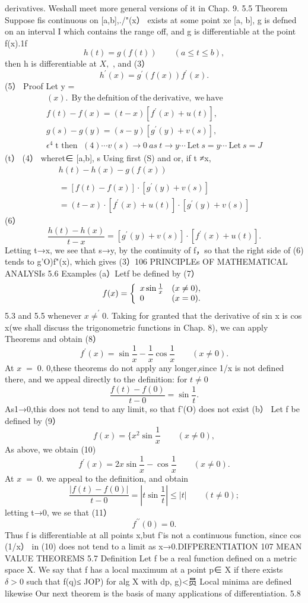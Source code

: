 derivatives. Weshall meet more general versions of it in Chap. 9. 5.5 Theorem Suppose fis continuous on [a,b],./"(x） exists at some point xe [a, b], g is defned on an interval I which contains the range off, and g is differentiable at the point f(x).1f $$ h(t)=g(f(t))\qquad(a\leq t\leq b), $$ then h is differentiable at $X,$ , and (3） $$ h^{\prime}(x)=g^{\prime}(f(x))f^{\prime}(x). $$ (5） Proof Let y = $$ \begin{array}{l}{{(x).~~{\mathrm{By~the~defnition~of~the~derivative,~we~have}}}}\\ {{f(t)-f(x)=(t-x)[f^{\prime}(x)+u(t)],}}\\ {{g(s)-g(y)=(s-y)[g^{\prime}(y)+v(s)],}}\\ {{\epsilon^{4}\operatorname{t~then~}(4)\cdots v(s)\to0~a s~t\to y\cdots~{\mathrm{Let}}~s=y\cdots~{\mathrm{Let}}~s=J}}\end{array} $$ (t） (4） wheret∈ [a,b], s Using first (S) and or, if t ≠x, $$ \begin{array}{c}{{h(t)-h(x)-g(f(x))}}\\ {{}}\\ {{=[f(t)-f(x)]\cdot[g^{\prime}(y)+v(s)]}}\\ {{=(t-x)\cdot[f^{\prime}(x)+u(t)]\cdot[g^{\prime}(y)+v(s)]}}\end{array} $$ (6） $$ {\frac{h(t)-h(x)}{t-x}}=[g^{\prime}(y)+v(s)]\cdot[f^{\prime}(x)+u(t)]. $$ Letting t→x, we see that s→y, by the continuity of f，so that the right side of (6) tends to g'O)f"(x), which gives (3）106 PRINCIPLEs OF MATHEMATICAL ANALYSIs 5.6 Examples (a）Letf be defined by (7） $$ f(x)={\left\{\begin{array}{l l}{x\sin{\frac{1}{x}}}&{(x\neq0),}\\ {0}&{(x=0).}\end{array}\right.} $$ 5.3 and 5.5 whenever $x\neq^{\prime}0.$ Taking for granted that the derivative of sin x is cos x(we shall discuss the trigonometric functions in Chap. 8), we can apply Theorems and obtain (8） $$ f^{\prime}(x)=\sin{\frac{1}{x}}-{\frac{1}{x}}\cos{\frac{1}{x}}\qquad(x\neq0). $$ At $\scriptstyle x\;=\;0.$ 0,these theorems do not apply any longer,since 1/x is not defined there, and we appeal directly to the definition: for $t\neq0$ $$ {\frac{f(t)-f(0)}{t-0}}=\sin{\frac{1}{t}}. $$ As1→0,this does not tend to any limit, so that f'(O) does not exist (b） Let f be defined by (9） $$ f(x)={ \{x^{2}\sin{\frac{1}{x}}}\qquad(x\neq0), $$ As above, we obtain (10) $$ f^{\prime}(x)=2x\sin{\frac{1}{x}}-\cos{\frac{1}{x}}\qquad(x\neq0). $$ At $\scriptstyle x\;=\;0.$ we appeal to the definition, and obtain $$ {\frac{|f(t)-f(0)|}{t-0}}=\left|t\sin{\frac{1}{t}}\right|\leq|t|\qquad(t\neq0); $$ letting t→0, we se that (11） $$ f^{\prime\prime}(0)=0. $$ Thus f is differentiable at all points x,but f’is not a continuous function, since cos (1/x） in (10) does not tend to a limit as x→0.DIFPERENTIATION 107 MEAN VALUE THEOREMS 5.7 Definition Let f be a real function defined on a metric space X. We say that f has a local maximum at a point p∈ X if there exists $\delta>0$ such that f(q)≤ JOP) for alg X with dp, g)<员 Local minima are defined likewise Our next theorem is the basis of many applications of differentiation. 5.8 
